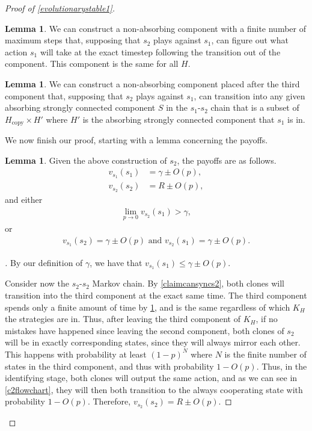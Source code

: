 \documentclass[12pt]{article}
\theoremstyle{definition}
\newtheorem{lemma}[theorem]{Lemma}
\theoremstyle{remark}
\newenvironment{subproof}[1][\proofname]{%
  \renewcommand{\qedsymbol}{$\blacksquare$}%
  \begin{proof}[#1]%
}{%
  \end{proof}%
}
\begin{document}
\begin{proof}[Proof of \cref{evolutionarystable1}]
      \begin{lemma}
        \label{claimcanfigureout}
        We can construct a non-absorbing component with a finite number of maximum steps that, supposing that $s_2$ plays against $s_1$, can figure out what action $s_1$ will take at the exact timestep following the transition out of the component. This component is the same for all $H$.
      \end{lemma}

      \begin{lemma}
        \label{claimcanforcegoodstate}
        We can construct a non-absorbing component placed after the third component that, supposing that $s_2$ plays against $s_1$, can transition into any given absorbing strongly connected component $S$ in the $s_1$-$s_2$ chain that is a subset of $H_\text{copy} \times H'$ where $H'$ is the absorbing strongly connected component that $s_1$ is in.
      \end{lemma}

      We now finish our proof, starting with a lemma concerning the payoffs.

      \begin{lemma}
        \label{claimpayoffs}
        Given the above construction of $s_2$, the payoffs are as follows.
      \begin{align*}
        v_{s_1}(s_1) &= \gamma \pm O(p), \\
        v_{s_2}(s_2) &= R \pm O(p),
      \end{align*}
      and either
      \begin{align*}
        \lim_{p \to 0} v_{s_2}(s_1) > \gamma,
      \end{align*}
      or
      \begin{align*}
        v_{s_1}(s_2) = \gamma \pm O(p) \text{ and }
        v_{s_2}(s_1) = \gamma \pm O(p).
      \end{align*}
      \end{lemma}
      \begin{subproof}
        By our definition of $\gamma$, we have that $v_{s_1}(s_1) \leq \gamma \pm O(p)$.

        Consider now the $s_2$-$s_2$ Markov chain. By \cref{claimcansyncs2}, both clones will transition into the third component at the exact same time. The third component spends only a finite amount of time by \cref{claimcanfigureout}, and is the same regardless of which $K_H$ the strategies are in. Thus, after leaving the third component of $K_H$, if no mistakes have happened since leaving the second component, both clones of $s_2$ will be in exactly corresponding states, since they will always mirror each other. This happens with probability at least $(1-p)^N$ where $N$ is the finite number of states in the third component, and thus with probability $1 - O(p)$. Thus, in the identifying stage, both clones will output the same action, and as we can see in \cref{c2flowchart}, they will then both transition to the always cooperating state with probability $1 - O(p)$. Therefore, $v_{s_2}(s_2) = R \pm O(p)$.


\end{subproof}
\end{proof}
\end{document}
